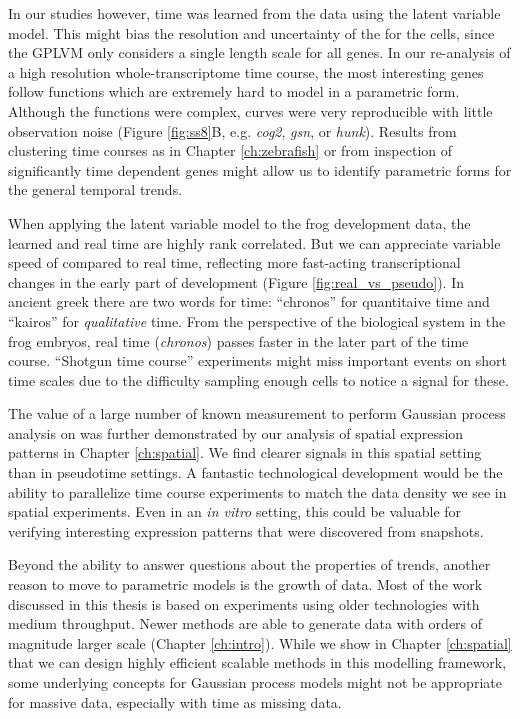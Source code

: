 In our studies however, time was learned from the data using the latent variable model. This might bias the resolution and uncertainty of the  for the cells, since the GPLVM only considers a single length scale for all genes. In our re-analysis of a high resolution whole-transcriptome time course, the most interesting genes follow functions which are extremely hard to model in a parametric form. Although the functions were complex, curves were very reproducible with little observation noise (Figure \ref{fig:ss8}B, e.g. \textit{cog2}, \textit{gsn}, or \textit{hunk}). Results from clustering time courses as in Chapter \ref{ch:zebrafish} or from inspection of significantly time dependent genes might allow us to identify parametric forms for the general temporal trends.

When applying the latent variable model to the frog development data, the learned  and real time are highly rank correlated. But we can appreciate variable speed of  compared to real time, reflecting more fast-acting transcriptional changes in the early part of development (Figure \ref{fig:real_vs_pseudo}). In ancient greek there are two words for time: ``chronos'' for quantitaive time and ``kairos'' for \textit{qualitative} time. From the perspective of the biological system in the frog embryos, real time (\textit{chronos}) passes faster in the later part of the time course. ``Shotgun time course'' experiments might miss important events on short time scales due to the difficulty sampling enough cells to notice a signal for these.

The value of a large number of known measurement to perform Gaussian process analysis on was further demonstrated by our analysis of spatial expression patterns in Chapter \ref{ch:spatial}. We find clearer signals in this spatial setting than in pseudotime settings. A fantastic technological development would be the ability to parallelize time course experiments to match the data density we see in spatial experiments. Even in an \textit{in vitro} setting, this could be valuable for verifying interesting expression patterns that were discovered from snapshots.

Beyond the ability to answer questions about the properties of trends, another reason to move to parametric models is the growth of data. Most of the work discussed in this thesis is based on experiments using older technologies with medium throughput. Newer methods are able to generate data with orders of magnitude larger scale (Chapter \ref{ch:intro}). While we show in Chapter \ref{ch:spatial} that we can design highly efficient scalable methods in this modelling framework, some underlying concepts for Gaussian process models might not be appropriate for massive data, especially with  time as missing data.

